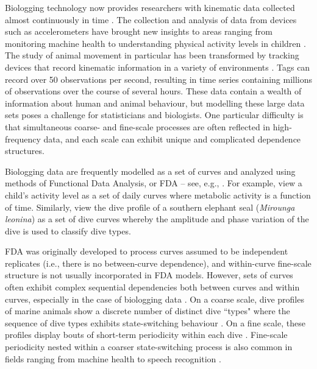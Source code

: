 
Biologging technology now provides researchers with kinematic data collected almost continuously in time \citep{Hooten:2017}.
The collection and analysis of data from devices such as accelerometers have brought new insights to areas ranging from monitoring machine health \citep{Getman:2009} to understanding physical activity levels in children \citep{Morris:2007}. The study of animal movement in particular has been transformed by tracking devices that record kinematic information in a variety of environments \citep{Borger:2020,Dot:2016b}. Tags can record over 50 observations per second, resulting in time series containing millions of observations over the course of several hours. %
These data contain a wealth of information about human and animal behaviour, but modelling these large data sets poses a challenge for statisticians and biologists. One particular difficulty is that simultaneous coarse- and fine-scale processes are often reflected in high-frequency data, and each scale can exhibit unique and complicated dependence structures.

Biologging data are frequently modelled as a set of curves and analyzed using methods of Functional Data Analysis, or FDA -- see, e.g., \citet{Ramsay:2005}. For example, \citet{Morris:2007} view a child's activity level as a set of daily curves where metabolic activity is a function of time. Similarly, \citet{Fu:2017} view the dive profile of a southern elephant seal (\textit{Mirounga leonina}) as a set of dive curves whereby the amplitude and phase variation of the dive is used to classify dive types.

FDA was originally developed to process curves assumed to be independent replicates (i.e., there is no between-curve dependence), and within-curve fine-scale structure is not usually incorporated in FDA models. However, sets of curves often exhibit complex sequential dependencies both between curves and within curves, especially in the case of biologging data \citep{Barajas:2017}.
On a coarse scale, dive profiles of marine animals show a discrete number of distinct dive ``types"
where the sequence of dive types exhibits state-switching behaviour \citep{Tennessen:2019b}. On a fine scale, these profiles display bouts of short-term periodicity within each dive \citep{Adam:2019}. Fine-scale periodicity nested within a coarser state-switching process is also common in fields ranging from machine health \citep{Xin:2018,Lucero:2019} to speech recognition \citep{Juang:1991}. 

